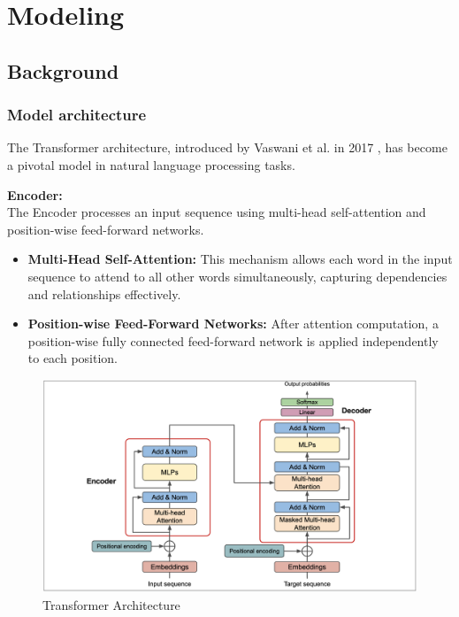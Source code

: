 \chapter{Modeling} 

\section{Background}

\subsection{Model architecture} 

The Transformer architecture, introduced by Vaswani et al. in 2017 \cite{vaswani2017attention}, has become a pivotal model in natural language processing tasks.

\hfill \break
\textbf{Encoder:} \\
The Encoder processes an input sequence using multi-head self-attention and position-wise feed-forward networks.


\begin{itemize}
    \item \textbf{Multi-Head Self-Attention:} This mechanism allows each word in the input sequence to attend to all other words simultaneously, capturing dependencies and relationships effectively.
    
    \item \textbf{Position-wise Feed-Forward Networks:} After attention computation, a position-wise fully connected feed-forward network is applied independently to each position.
\end{itemize}

\begin{figure}[h!]
	\centering
	\includegraphics[scale=0.3]{figures/transformer.png}
	\caption{Transformer Architecture}
\end{figure}

